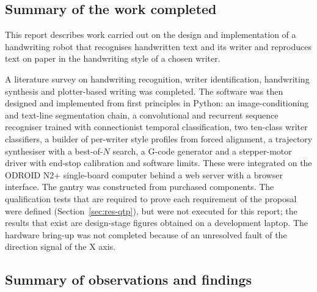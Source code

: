 \subsection{Summary of the work completed}
\label{sec:con-work}

This report describes work carried out on the design and implementation of a handwriting robot that recognises handwritten text and its writer and reproduces text on paper in the handwriting style of a chosen writer.

A literature survey on handwriting recognition, writer identification, handwriting synthesis and plotter-based writing was completed.
The software was then designed and implemented from first principles in Python: an image-conditioning and text-line segmentation chain, a convolutional and recurrent sequence recogniser trained with connectionist temporal classification, two ten-class writer classifiers, a builder of per-writer style profiles from forced alignment, a trajectory synthesiser with a best-of-$N$ search, a G-code generator and a stepper-motor driver with end-stop calibration and software limits.
These were integrated on the ODROID N2+ single-board computer behind a web server with a browser interface.
The gantry was constructed from purchased components.
The qualification tests that are required to prove each requirement of the proposal were defined (Section~\ref{sec:res-qtp}), but were not executed for this report; the results that exist are design-stage figures obtained on a development laptop.
The hardware bring-up was not completed because of an unresolved fault of the direction signal of the X axis.

\subsection{Summary of observations and findings}
\label{sec:con-findings}

